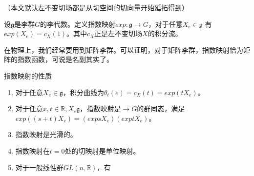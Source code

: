 
（本文默认左不变切场都是从切空间的切向量开始延拓得到）
\begin{definition}{}
设$\mathfrak g$是李群$G$的李代数。定义指数映射$exp:\mathfrak g\to G$，对于任意$X_e\in \mathfrak g$ 有$exp(X_e)=c_X(1)$。其中$c_X$正是左不变切场$X$的积分流。
\end{definition}
在物理上，我们经常要用到矩阵李群。可以证明，对于矩阵李群，指数映射恰为矩阵的指数函数，可说是名副其实了。

\begin{theorem}{指数映射的性质}
\begin{enumerate}
\item 对于任意$X_e\in \mathfrak g$，积分曲线为$\theta_t(e)=c_X(t)=exp(tX_e)$。
\item 对于任意$x,t\in\mathbb R,X_e\mathfrak g$，指数映射是$\mathbb\to G$的群同态，满足$exp((s+t)X_e)=(expsX_e)(exptX_e)$。
\item 指数映射是光滑的。
\item 指数映射在$t=0$处的切映射是单位映射。
\item 对于一般线性群$GL(n,\mathbb R)$，有
\end{enumerate}
\end{theorem}

